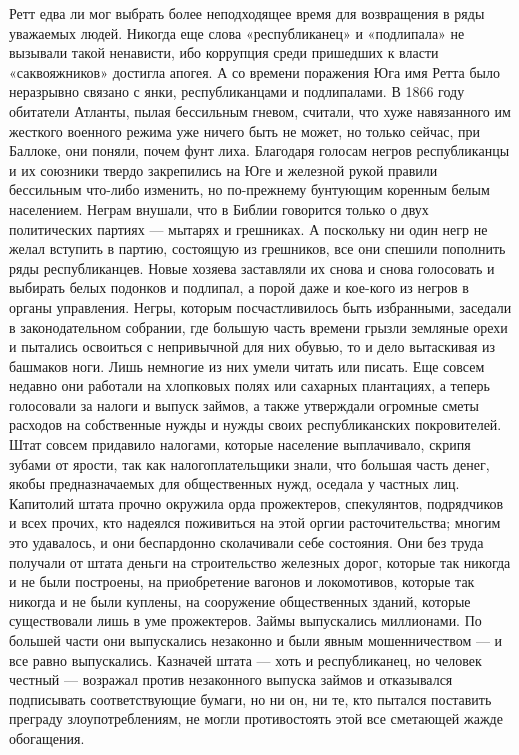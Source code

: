 Ретт едва ли мог выбрать более неподходящее время для возвращения в ряды уважаемых людей. Никогда еще слова «республиканец» и «подлипала» не вызывали такой ненависти, ибо коррупция среди пришедших к власти «саквояжников» достигла апогея. А со времени поражения Юга имя Ретта было неразрывно связано с янки, республиканцами и подлипалами.
В 1866 году обитатели Атланты, пылая бессильным гневом, считали, что хуже навязанного им жесткого военного режима уже ничего быть не может, но только сейчас, при Баллоке, они поняли, почем фунт лиха. Благодаря голосам негров республиканцы и их союзники твердо закрепились на Юге и железной рукой правили бессильным что-либо изменить, но по-прежнему бунтующим коренным белым населением.
Неграм внушали, что в Библии говорится только о двух политических партиях — мытарях и грешниках. А поскольку ни один негр не желал вступить в партию, состоящую из грешников, все они спешили пополнить ряды республиканцев. Новые хозяева заставляли их снова и снова голосовать и выбирать белых подонков и подлипал, а порой даже и кое-кого из негров в органы управления. Негры, которым посчастливилось быть избранными, заседали в законодательном собрании, где большую часть времени грызли земляные орехи и пытались освоиться с непривычной для них обувью, то и дело вытаскивая из башмаков ноги. Лишь немногие из них умели читать или писать. Еще совсем недавно они работали на хлопковых полях или сахарных плантациях, а теперь голосовали за налоги и выпуск займов, а также утверждали огромные сметы расходов на собственные нужды и нужды своих республиканских покровителей. Штат совсем придавило налогами, которые население выплачивало, скрипя зубами от ярости, так как налогоплательщики знали, что большая часть денег, якобы предназначаемых для общественных нужд, оседала у частных лиц.
Капитолий штата прочно окружила орда прожектеров, спекулянтов, подрядчиков и всех прочих, кто надеялся поживиться на этой оргии расточительства; многим это удавалось, и они беспардонно сколачивали себе состояния. Они без труда получали от штата деньги на строительство железных дорог, которые так никогда и не были построены, на приобретение вагонов и локомотивов, которые так никогда и не были куплены, на сооружение общественных зданий, которые существовали лишь в уме прожектеров. Займы выпускались миллионами. По большей части они выпускались незаконно и были явным мошенничеством — и все равно выпускались. Казначей штата — хоть и республиканец, но человек честный — возражал против незаконного выпуска займов и отказывался подписывать соответствующие бумаги, но ни он, ни те, кто пытался поставить преграду злоупотреблениям, не могли противостоять этой все сметающей жажде обогащения.

